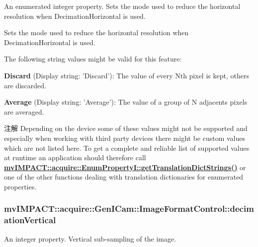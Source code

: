 An enumerated integer property. Sets the mode used to reduce the horizontal resolution when Decimation\+Horizontal is used. 

Sets the mode used to reduce the horizontal resolution when Decimation\+Horizontal is used.

The following string values might be valid for this feature\+:
\begin{DoxyItemize}
\item {\bfseries Discard} (Display string\+: 'Discard')\+: The value of every Nth pixel is kept, others are discarded.
\item {\bfseries Average} (Display string\+: 'Average')\+: The value of a group of N adjacents pixels are averaged.
\end{DoxyItemize}

\begin{DoxyNote}{注解}
Depending on the device some of these values might not be supported and especially when working with third party devices there might be custom values which are not listed here. To get a complete and reliable list of supported values at runtime an application should therefore call {\bfseries \hyperlink{classmv_i_m_p_a_c_t_1_1acquire_1_1_enum_property_i_a0ba6ccbf5ee69784d5d0b537924d26b6}{mv\+I\+M\+P\+A\+C\+T\+::acquire\+::\+Enum\+Property\+I\+::get\+Translation\+Dict\+Strings()}} or one of the other functions dealing with translation dictionaries for enumerated properties. 
\end{DoxyNote}
\hypertarget{classmv_i_m_p_a_c_t_1_1acquire_1_1_gen_i_cam_1_1_image_format_control_aee18567f6502e019607cab86903a68af}{
\subsubsection[{decimation\+Vertical}]{ mv\+I\+M\+P\+A\+C\+T\+::acquire\+::\+Gen\+I\+Cam\+::\+Image\+Format\+Control\+::decimation\+Vertical}}\label{classmv_i_m_p_a_c_t_1_1acquire_1_1_gen_i_cam_1_1_image_format_control_aee18567f6502e019607cab86903a68af}


An integer property. Vertical sub-\/sampling of the image. 

